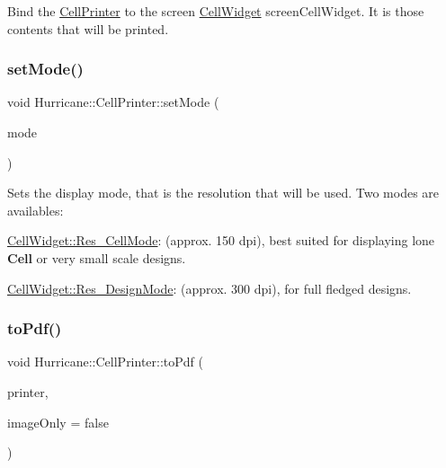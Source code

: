 Bind the \mbox{\hyperlink{classHurricane_1_1CellPrinter}{Cell\+Printer}} to the screen \mbox{\hyperlink{classHurricane_1_1CellWidget}{Cell\+Widget}} {\ttfamily screen\+Cell\+Widget}. It is those contents that will be printed. \mbox{\label{classHurricane_1_1CellPrinter_a27a285de4f74f07f78e16cc101f05ef7}} 
\subsubsection{\texorpdfstring{set\+Mode()}{setMode()}}
{\footnotesize\ttfamily void Hurricane\+::\+Cell\+Printer\+::set\+Mode (\begin{DoxyParamCaption}\item[{int}]{mode }\end{DoxyParamCaption})\hspace{0.3cm}{\ttfamily [inline]}}

Sets the display mode, that is the resolution that will be used. Two modes are availables\+: 
\begin{DoxyItemize}
\item \mbox{\hyperlink{classHurricane_1_1CellWidget_a4b81fed78775d491c169b649870d9dd7af37fd1c10fd363f0ad04a94dbccd5789}{Cell\+Widget\+::\+Res\+\_\+\+Cell\+Mode}}\+: (approx. 150 dpi), best suited for displaying lone \textbf{ Cell} or very small scale designs. 
\item \mbox{\hyperlink{classHurricane_1_1CellWidget_a4b81fed78775d491c169b649870d9dd7a0c7c9bd939930fe178b5b8bcd84bdc1e}{Cell\+Widget\+::\+Res\+\_\+\+Design\+Mode}}\+: (approx. 300 dpi), for full fledged designs. 
\end{DoxyItemize}\mbox{\label{classHurricane_1_1CellPrinter_ac595a0549c1086ab92a3bc56609246ac}} 
\subsubsection{\texorpdfstring{to\+Pdf()}{toPdf()}}
{\footnotesize\ttfamily void Hurricane\+::\+Cell\+Printer\+::to\+Pdf (\begin{DoxyParamCaption}\item[{Q\+Printer $\ast$}]{printer,  }\item[{bool}]{image\+Only = {\ttfamily false} }\end{DoxyParamCaption})}


